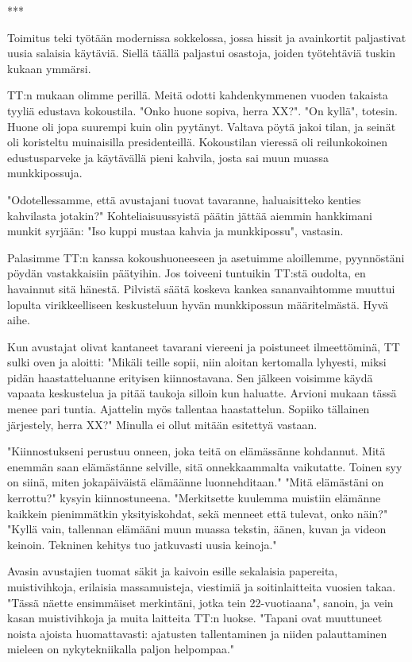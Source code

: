 ﻿\documentclass[a4paper, 12pt, finnish]{article}
\begin{document}
***

Toimitus teki työtään modernissa sokkelossa, jossa hissit ja
avainkortit paljastivat uusia salaisia käytäviä. Siellä täällä
paljastui osastoja, joiden työtehtäviä tuskin kukaan ymmärsi.

TT:n mukaan olimme perillä. Meitä odotti kahdenkymmenen vuoden
takaista tyyliä edustava kokoustila. "Onko huone sopiva, herra XX?".
"On kyllä", totesin. Huone oli jopa suurempi kuin olin pyytänyt.
Valtava pöytä jakoi tilan, ja seinät oli koristeltu muinaisilla
presidenteillä. Kokoustilan vieressä oli reilunkokoinen
edustusparveke ja käytävällä pieni kahvila, josta sai muun
muassa munkkipossuja.

"Odotellessamme, että avustajani tuovat tavaranne,
haluaisitteko kenties kahvilasta jotakin?" Kohteliaisuussyistä päätin
jättää aiemmin hankkimani munkit syrjään: "Iso kuppi mustaa kahvia
ja munkkipossu", vastasin.

Palasimme TT:n kanssa kokoushuoneeseen ja asetuimme aloillemme,
pyynnöstäni pöydän vastakkaisiin päätyihin.
Jos toiveeni tuntuikin TT:stä oudolta, en havainnut sitä hänestä.
Pilvistä säätä koskeva kankea sananvaihtomme muuttui lopulta
virikkeelliseen keskusteluun hyvän munkkipossun määritelmästä.
Hyvä aihe.

Kun avustajat olivat kantaneet tavarani viereeni ja poistuneet
ilmeettöminä, TT sulki oven ja aloitti:
"Mikäli teille sopii, niin aloitan kertomalla lyhyesti,
miksi pidän haastatteluanne erityisen kiinnostavana. Sen jälkeen
voisimme käydä vapaata keskustelua ja pitää taukoja silloin kun haluatte.
Arvioni mukaan tässä menee pari tuntia. Ajattelin myös tallentaa
haastattelun. Sopiiko tällainen järjestely, herra XX?"
Minulla ei ollut mitään esitettyä vastaan.

"Kiinnostukseni perustuu onneen, joka teitä on elämässänne kohdannut.
Mitä enemmän saan elämästänne selville, sitä onnekkaammalta vaikutatte.
Toinen syy on siinä, miten jokapäiväistä elämäänne luonnehditaan."
"Mitä elämästäni on kerrottu?" kysyin kiinnostuneena.
"Merkitsette kuulemma muistiin elämänne kaikkein pienimmätkin
yksityiskohdat, sekä menneet että tulevat, onko näin?"
"Kyllä vain, tallennan elämääni muun muassa tekstin, äänen,
kuvan ja videon keinoin. Tekninen kehitys tuo jatkuvasti
uusia keinoja."

Avasin avustajien tuomat säkit ja kaivoin esille sekalaisia
papereita, muistivihkoja, erilaisia massamuisteja, viestimiä
ja soitinlaitteita vuosien takaa.
"Tässä näette ensimmäiset merkintäni, jotka tein 22-vuotiaana",
sanoin, ja vein kasan muistivihkoja ja muita laitteita TT:n
luokse. "Tapani ovat muuttuneet noista ajoista huomattavasti:
ajatusten tallentaminen ja niiden palauttaminen mieleen on
nykytekniikalla paljon helpompaa."
\end{document}
